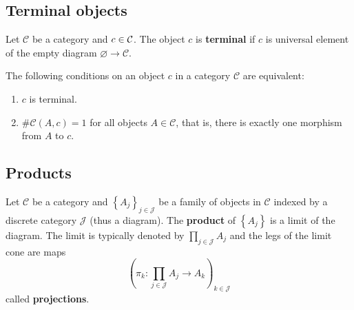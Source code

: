 \documentclass[12pt, oneside]{book}
\begin{document}
\subsection{Terminal objects}
\begin{definition}
    Let $\mathcal{C}$ be a category and $c\in \cal C$.
    The object $c$ is \textbf{terminal} if $ c $ is universal element of the empty diagram $\varnothing \to \mathcal{C}$.
\end{definition}
\begin{proposition}
    The following conditions on an object $c$ in a category $\mathcal{C}$ are equivalent:
    \begin{enumerate}
        \item
              $c$ is terminal.
        \item
              $\#\mathcal{C}\left(A,c\right)=1 $ for all objects $A\in \mathcal{C}$, that is, there is exactly one morphism from $A$ to $c$.
    \end{enumerate}
\end{proposition}


\subsection{Products}

\begin{definition}
    Let $\mathcal{C}$ be a category and $\left\{A_j\right\}_{j \in \mathcal{J}}$ be a family of objects in $\mathcal{C}$ indexed by a discrete category $\mathcal{J}$ (thus a diagram).
    The \textbf{product} of $\left\{A_j\right\}$ is a limit of the diagram.
    The limit is typically denoted by $\prod_{j \in \mathcal{J}} A_j$ and the legs of the limit cone are maps
    \begin{equation*}
        \left(\pi_k: \prod_{j \in \mathcal{J}} A_j \rightarrow A_k\right)_{k \in \mathcal{J}}
    \end{equation*}
    called \textbf{projections}.
\end{definition}
\end{document}
